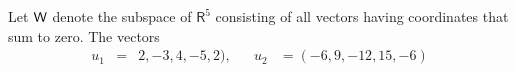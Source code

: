 Let $\mathsf{W}$ denote the subspace of $\mathsf{R}^5$ consisting of all
vectors having coordinates that sum to zero. The vectors
\begin{align*}
u_1 &= &2,-3,4,-5,2), & & u_2 &= (-6,9,-12,15,-6)
\end{align*}
